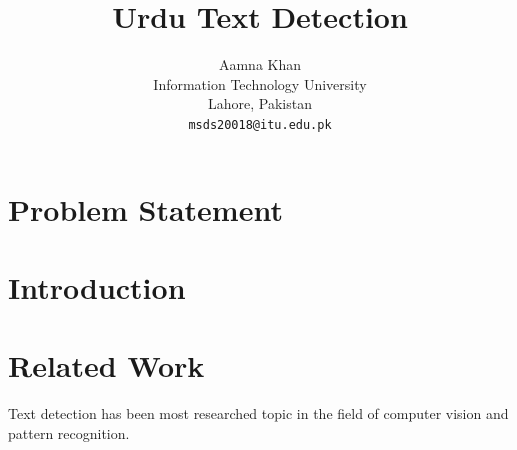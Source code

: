 \documentclass[final]{cvpr}
\begin{document}

\title{Urdu Text Detection}

\author{Aamna Khan\\
Information Technology University\\
Lahore, Pakistan\\
{\tt\small msds20018@itu.edu.pk}

}

\maketitle

\section{Problem Statement}



\section{Introduction}



\section{Related Work}
Text detection has been most researched topic in the field of computer vision and pattern recognition.











{\small


}
\end{document}
